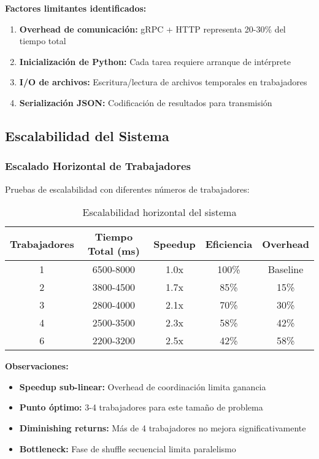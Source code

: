 \textbf{Factores limitantes identificados:}
\begin{enumerate}
    \item \textbf{Overhead de comunicación:} gRPC + HTTP representa 20-30\% del tiempo total
    \item \textbf{Inicialización de Python:} Cada tarea requiere arranque de intérprete
    \item \textbf{I/O de archivos:} Escritura/lectura de archivos temporales en trabajadores
    \item \textbf{Serialización JSON:} Codificación de resultados para transmisión
\end{enumerate}

\subsection{Escalabilidad del Sistema}

\subsubsection{Escalado Horizontal de Trabajadores}

Pruebas de escalabilidad con diferentes números de trabajadores:

\begin{table}[H]
\centering
\begin{tabular}{|c|c|c|c|c|}
\hline
\textbf{Trabajadores} & \textbf{Tiempo Total (ms)} & \textbf{Speedup} & \textbf{Eficiencia} & \textbf{Overhead} \\
\hline
1 & 6500-8000 & 1.0x & 100\% & Baseline \\
2 & 3800-4500 & 1.7x & 85\% & 15\% \\
3 & 2800-4000 & 2.1x & 70\% & 30\% \\
4 & 2500-3500 & 2.3x & 58\% & 42\% \\
6 & 2200-3200 & 2.5x & 42\% & 58\% \\
\hline
\end{tabular}
\caption{Escalabilidad horizontal del sistema}
\label{table:scalability}
\end{table}

\textbf{Observaciones:}
\begin{itemize}
    \item \textbf{Speedup sub-linear:} Overhead de coordinación limita ganancia
    \item \textbf{Punto óptimo:} 3-4 trabajadores para este tamaño de problema
    \item \textbf{Diminishing returns:} Más de 4 trabajadores no mejora significativamente
    \item \textbf{Bottleneck:} Fase de shuffle secuencial limita paralelismo
\end{itemize}

